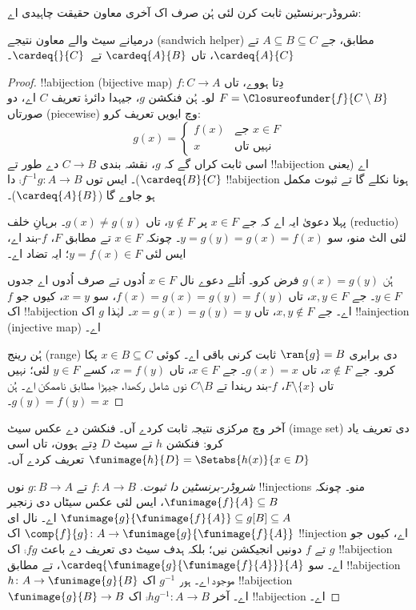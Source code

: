 \documentclass[../../../include/open-logic-section]{subfiles}
\begin{document}
شروڈر-برنسٹین ثابت کرن لئی ہُن صرف اک آخری معاون حقیقت چاہیدی اے:

\begin{prop}
درمیانے سیٹ والے معاون نتیجے (sandwich helper) مطابق، جے
$A \subseteq B \subseteq C$ تے $\cardeq{A}{C}$، تاں $\cardeq{A}{B}$ تے~$\cardeq{}{C}$۔
\end{prop}

\begin{proof}
!!a{bijection} (bijective map) $f \colon C \to A$ دِتا ہووے، تاں
$F = \Closureofunder{f}{C \setminus B}$ لو۔ ہُن فنکشن $g$، جیہدا
دائرۂ تعریف $C$ اے، دو صورتاں (piecewise) وچ ایویں تعریف کرو:
\[
	g(x) =
	\begin{cases}
			f(x) &\text{جے $x \in F$}\\
			x & \text{نہیں تاں}
	\end{cases}
\]
اسی ثابت کراں گے کہ $g$، نقشہ بندی $C \to B$ دے طور تے
!!a{bijection} اے (یعنی $\cardeq{B}{C}$)۔ ایس توں $\comp{f^{-1}}{g} \colon A \to B$ دا
!!a{bijection} ہونا نکلے گا تے ثبوت مکمل ہو جاوے گا ($\cardeq{A}{B}$)۔

پہلا دعویٰ ایہ اے کہ جے $x \in F$ پر $y\notin F$، تاں $g(x) \neq
g(y)$۔ برہانِ خلف (reductio) لئی الٹ منو، سو $y = g(y) = g(x) =
f(x)$۔ چونکہ $x \in F$ تے  مطابق $F$، $f$-بند
اے، ایس لئی $y = f(x) \in F$؛ ایہ تضاد اے۔

ہُن $g(x) = g(y)$ فرض کرو۔ اُتلے دعوے نال $x \in F$ اُدوں تے صرف
اُدوں اے جدوں $y \in F$۔ جے $x, y \in F$، تاں $f(x) = g (x) =
g(y) = f(y)$، سو $x = y$، کیوں جو $f$ اک !!a{bijection} اے۔ جے
$x, y \notin F$، تاں $x = g(x) = g(y) = y$۔ لہٰذا $g$ اک
!!a{injection} (injective map) اے۔

ہُن رینج (range) دی برابری $\ran{g} = B$ ثابت کرنی باقی اے۔ کوئی
$x \in B \subseteq C$ پکا کرو۔ جے $x \notin F$، تاں $g(x) = x$۔
جے $x \in F$، تاں $x = f(y)$، کسے $y \in F$ لئی؛ نہیں تاں $F
\setminus \{x\}$، $f$-بند رہندا تے $C\setminus B$ نوں شامل رکھدا،
جیہڑا  مطابق ناممکن اے۔ ہُن $g(y) = f(y) = x$۔
\end{proof}

آخر وچ مرکزی نتیجہ ثابت کردے آں۔ فنکشن دے عکس سیٹ (image set) دی
تعریف یاد کرو: فنکشن $h$ تے سیٹ $D$ دِتے ہوون، تاں اسی
$\funimage{h}{D} = \Setabs{h(x)}{x \in D}$ تعریف کردے آں۔

\begin{proof}[شروڈر-برنسٹین دا ثبوت] $f \colon A \to B$ تے
$g \colon B \to A$ نوں !!{injection}s منو۔ چونکہ $\funimage{f}{A}
\subseteq B$، ایس لئی عکس سیٹاں دی زنجیر
$\funimage{g}{\funimage{f}{A}} \subseteq g[B] \subseteq A$ اے۔ نال
ای $\comp{f}{g} \colon A \to \funimage{g}{\funimage{f}{A}}$ اک
!!{injection} اے، کیوں جو $g$ تے $f$ دونیں انجیکشن نیں؛ بلکہ ہدف سیٹ
دی تعریف دے باعث $\comp{f}{g}$ اک !!a{bijection} اے۔ سو
$\cardeq{\funimage{g}{\funimage{f}{A}}}{A}$، تے 
مطابق !!a{bijection} $h \colon A \to \funimage{g}{B}$ موجود اے۔ ہور
$g^{-1}$ اک !!a{bijection} $\funimage{g}{B} \to B$ اے۔ آخر
$\comp{h}{g^{-1}} \colon A \to B$ اک !!a{bijection} اے۔
\end{proof}
\end{document}
